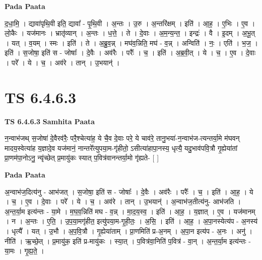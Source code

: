\documentclass[17pt]{extarticle}
\begin{document}
\textbf{Pada Paata} \newline

द॒धा॒मि॒ । द्यावा॑पृथि॒वी इति॒ द्यावा᳚ - पृ॒थि॒वी । अ॒न्तः । उ॒रु । अ॒न्तरि॑क्षम् । इति॑ । आ॒ह॒ । ए॒भिः । ए॒व । लो॒कैः । यज॑मानः । भ्रातृ॑व्यान् । अ॒न्तः । ध॒त्ते॒ । ते । दे॒वाः । अ॒म॒न्य॒न्त॒ । इन्द्रः॑ । वै । इ॒दम् । अ॒भू॒त् । यत् । व॒यम् । स्मः । इति॑ । ते । अ॒ब्रु॒व॒न्न् । मघ॑व॒न्निति॒ मघ॑ - व॒न्न् । अन्विति॑ । नः॒ । एति॑ । भ॒ज॒ । इति॑ । स॒जोषा॒ इति॑ स - जोषाः᳚ । दे॒वैः । अव॑रैः । परैः᳚ । च॒ । इति॑ । अ॒ब्र॒वी॒त् । ये । च॒ । ए॒व । दे॒वाः । परे᳚ । ये । च॒ । अव॑रे । तान् । उ॒भयान्॑ ।  \newline





\section{ TS 6.4.6.3 }

\textbf{TS 6.4.6.3 } \newline
\textbf{Samhita Paata} \newline

न॒न्वाभ॑जथ् स॒जोषा॑ दे॒वैरव॑रैः॒ परै॒श्चेत्या॑ह॒ ये चै॒व दे॒वाः परे॒ ये चाव॑रे॒ तानु॒भया॑-न॒न्वाभ॑ज-त्यन्तर्या॒मे म॑घवन् मादय॒स्वेत्या॑ह य॒ज्ञादे॒व यज॑मानं॒ नान्तरे᳚त्युपया॒म-गृ॑हीतो॒ ऽसीत्या॑हापा॒नस्य॒ धृत्यै॒ यदु॒भाव॑पवि॒त्रौ गृ॒ह्येया॑तां प्रा॒णम॑पा॒नोऽनु॒ न्यृ॑च्छेत् प्र॒मायु॑कः स्यात् प॒वित्र॑वानन्तर्या॒मो गृ॑ह्यते- [  ] \newline

\textbf{Pada Paata} \newline

अ॒न्वाभ॑ज॒दित्य॑नु - आभ॑जत् । स॒जोषा॒ इति॑ स - जोषाः᳚ । दे॒वैः । अव॑रैः । परैः᳚ । च॒ । इति॑ । आ॒ह॒ । ये । च॒ । ए॒व । दे॒वाः । परे᳚ । ये । च॒ । अव॑रे । तान् । उ॒भयान्॑ । अ॒न्वाभ॑ज॒तीत्य॑नु- आभ॑जति । अ॒न्त॒र्या॒म इत्य॑न्तः - या॒मे । म॒घ॒व॒न्निति॑ मघ - व॒न्न् । मा॒द॒य॒स्व॒ । इति॑ । आ॒ह॒ । य॒ज्ञात् । ए॒व । यज॑मानम् । न । अ॒न्तः । ए॒ति॒ । उ॒प॒या॒मगृ॑हीत॒ इत्यु॑पया॒म-गृ॒ही॒तः॒ । अ॒सि॒ । इति॑ । आ॒ह॒ । अ॒पा॒नस्येत्य॑प - अ॒नस्य॑ । धृत्यै᳚ । यत् । उ॒भौ । अ॒प॒वि॒त्रौ । गृ॒ह्येया॑ताम् । प्रा॒णमिति॑ प्र-अ॒नम् । अ॒पा॒न इत्य॑प - अ॒नः । अनु॑ । नीति॑ । ऋ॒च्छे॒त् । प्र॒मायु॑क॒ इति॑ प्र-मायु॑कः । स्या॒त् । प॒वित्र॑वा॒निति॑ प॒वित्र॑ - वा॒न् । अ॒न्त॒र्या॒म इत्य॑न्तः - या॒मः । गृ॒ह्य॒ते॒ ।  \newline




\end{document}
